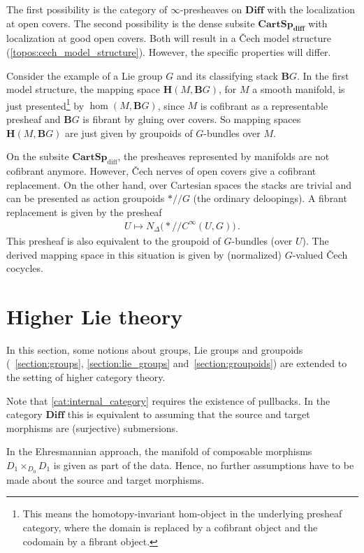     The first possibility is the category of $\infty$-presheaves on $\mathbf{Diff}$ with the localization at open covers. The second possibility is the dense subsite $\mathbf{CartSp_{\text{diff}}}$ with localization at good open covers. Both will result in a \v{C}ech model structure (\cref{topos:cech_model_structure}). However, the specific properties will differ.

    \begin{example}
        Consider the example of a Lie group $G$ and its classifying stack $\mathbf{B}G$. In the first model structure, the mapping space $\mathbf{H}(M,\mathbf{B}G)$, for $M$ a smooth manifold, is just presented\footnote{This means the homotopy-invariant hom-object in the underlying presheaf category, where the domain is replaced by a cofibrant object and the codomain by a fibrant object.} by $\hom(M,\mathbf{B}G)$, since $M$ is cofibrant as a representable presheaf and $\mathbf{B}G$ is fibrant by gluing over covers. So mapping spaces $\mathbf{H}(M,\mathbf{B}G)$ are just given by groupoids of $G$-bundles over $M$.

        On the subsite $\mathbf{CartSp}_{\text{diff}}$, the presheaves represented by manifolds are not cofibrant anymore. However, \v{C}ech nerves of open covers give a cofibrant replacement. On the other hand, over Cartesian spaces the stacks are trivial and can be presented as action groupoids $\ast/\!\!/G$ (the ordinary deloopings). A fibrant replacement is given by the presheaf
        \begin{gather}
            U\mapsto N_\Delta\bigl(\ast/\!\!/C^\infty(U,G)\bigr)\,.
        \end{gather}
        This presheaf is also equivalent to the groupoid of $G$-bundles (over $U$). The derived mapping space in this situation is given by (normalized) $G$-valued \v{C}ech cocycles.
    \end{example}

\section{Higher Lie theory}

    In this section, some notions about groups, Lie groups and groupoids (~\ref{section:groups}, \ref{section:lie_groups} and~\ref{section:groupoids}) are extended to the setting of higher category theory.

    \begin{remark}
        Note that \cref{cat:internal_category} requires the existence of pullbacks. In the category $\mathbf{Diff}$ this is equivalent to assuming that the source and target morphisms are (surjective) submersions.

        In the Ehresmannian approach, the manifold of composable morphisms $D_1\times_{D_0}D_1$ is given as part of the data. Hence, no further assumptions have to be made about the source and target morphisms.
    \end{remark}

